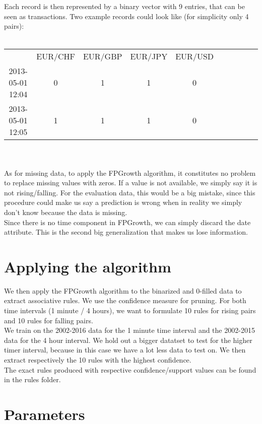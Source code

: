 \documentclass[paper=a4,fontsize=11pt,DIV=8,BCOR=5mm,twoside,pdftex]{scrartcl}
\begin{document}
	Each record is then represented by a binary vector with 9 entries, that can be seen as transactions. Two example records could look like (for simplicity only 4  pairs):\\
	\\
	 \begin{tabular}{c|c|c|c|c|c|c|c|c|c}
		&EUR/CHF&EUR/GBP&EUR/JPY&EUR/USD\\
		2013-05-01 12:04&0&1&1&0\\
		2013-05-01 12:05&1&1&1&0\\
	\end{tabular}
	\\
	\\
	As for missing data, to apply the FPGrowth algorithm, it constitutes no problem to replace missing values with zeros. If a value is not available, we simply say it is not rising/falling. For the evaluation data, this would be a big mistake, since this procedure could make us say a prediction is wrong when in reality we simply don't know because the data is missing.\\
		
	Since there is no time component in FPGrowth, we can simply discard the date attribute. This is the second big generalization that makes us lose information.\\
		
	\section{Applying the algorithm}
	
	We then apply the FPGrowth algorithm to the binarized and 0-filled data to extract associative rules. We use the confidence measure for pruning. For both time intervals (1 minute / 4 hours), we want to formulate  10 rules for  rising pairs and 10 rules for falling pairs.\\
	
	We train on the 2002-2016 data for the 1 minute time interval and the 2002-2015 data for the 4 hour interval. We hold out a bigger datatset to test for the higher timer interval, because in this case we have a lot less data to test on. We then extract respectively the 10 rules with the highest confidence.\\
	
	The exact rules produced with respective confidence/support values can be found in the rules folder.
	
	\section{Parameters}
	
\end{document}
